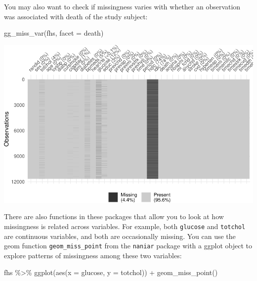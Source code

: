 \documentclass[
]{book}
\newenvironment{Shaded}{\begin{snugshade}}{\end{snugshade}}
\newcommand{\AttributeTok}[1]{\textcolor[rgb]{0.77,0.63,0.00}{#1}}
\newcommand{\FunctionTok}[1]{\textcolor[rgb]{0.00,0.00,0.00}{#1}}
\newcommand{\NormalTok}[1]{#1}
\newcommand{\SpecialCharTok}[1]{\textcolor[rgb]{0.00,0.00,0.00}{#1}}
\begin{document}
You may also want to check if missingness varies with whether an observation
was associated with death of the study subject:

\begin{Shaded}
\begin{Highlighting}[]
\FunctionTok{gg\_miss\_var}\NormalTok{(fhs, }\AttributeTok{facet =}\NormalTok{ death)}
\end{Highlighting}
\end{Shaded}

\includegraphics{adv_epi_analysis_files/figure-latex/unnamed-chunk-173-1.pdf}

There are also functions in these packages that allow you to look at how
missingness is related across variables. For example, both \texttt{glucose} and
\texttt{totchol} are continuous variables, and both are occasionally missing. You
can use the geom function \texttt{geom\_miss\_point} from the \texttt{naniar} package
with a ggplot object to explore patterns of missingness among these two
variables:

\begin{Shaded}
\begin{Highlighting}[]
\NormalTok{fhs }\SpecialCharTok{\%\textgreater{}\%} 
  \FunctionTok{ggplot}\NormalTok{(}\FunctionTok{aes}\NormalTok{(}\AttributeTok{x =}\NormalTok{ glucose, }\AttributeTok{y =}\NormalTok{ totchol)) }\SpecialCharTok{+} 
  \FunctionTok{geom\_miss\_point}\NormalTok{()}
\end{Highlighting}
\end{Shaded}
\end{document}
